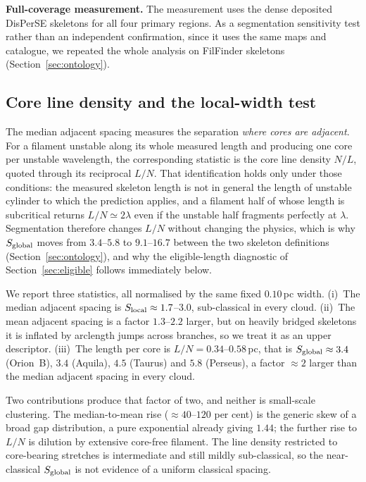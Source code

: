 \documentclass[usenatbib,twoside,twocolumn]{mnras}
\begin{document}
\smallskip\noindent\textbf{Full-coverage measurement.} The measurement uses the dense deposited DisPerSE skeletons for all four primary regions. As a segmentation sensitivity test rather than an independent confirmation, since it uses the same maps and catalogue, we repeated the whole analysis on FilFinder skeletons (Section~\ref{sec:ontology}).



\subsection{Core line density and the local-width test}
\label{sec:linedensity}

The median adjacent spacing measures the separation \emph{where cores are adjacent}. For a filament unstable along its whole measured length and producing one core per unstable wavelength, the corresponding statistic is the core line density $N/L$, quoted through its reciprocal $L/N$. That identification holds only under those conditions: the measured skeleton length is not in general the length of unstable cylinder to which the prediction applies, and a filament half of whose length is subcritical returns $L/N\simeq2\lambda$ even if the unstable half fragments perfectly at $\lambda$. Segmentation therefore changes $L/N$ without changing the physics, which is why $S_{\rm global}$ moves from $3.4$--$5.8$ to $9.1$--$16.7$ between the two skeleton definitions (Section~\ref{sec:ontology}), and why the eligible-length diagnostic of Section~\ref{sec:eligible} follows immediately below.

We report three statistics, all normalised by the same fixed $0.10$\,pc width. (i)~The median adjacent spacing is $S_{\rm local}\approx1.7$--$3.0$, sub-classical in every cloud. (ii)~The mean adjacent spacing is a factor $1.3$--$2.2$ larger, but on heavily bridged skeletons it is inflated by arclength jumps across branches, so we treat it as an upper descriptor. (iii)~The length per core is $L/N=0.34$--$0.58$\,pc, that is $S_{\rm global}\approx3.4$ (Orion~B), $3.4$ (Aquila), $4.5$ (Taurus) and $5.8$ (Perseus), a factor $\approx2$ larger than the median adjacent spacing in every cloud.

Two contributions produce that factor of two, and neither is small-scale clustering. The median-to-mean rise ($\approx40$--$120$ per cent) is the generic skew of a broad gap distribution, a pure exponential already giving $1.44$; the further rise to $L/N$ is dilution by extensive core-free filament. The line density restricted to core-bearing stretches is intermediate and still mildly sub-classical, so the near-classical $S_{\rm global}$ is not evidence of a uniform classical spacing.
\end{document}
